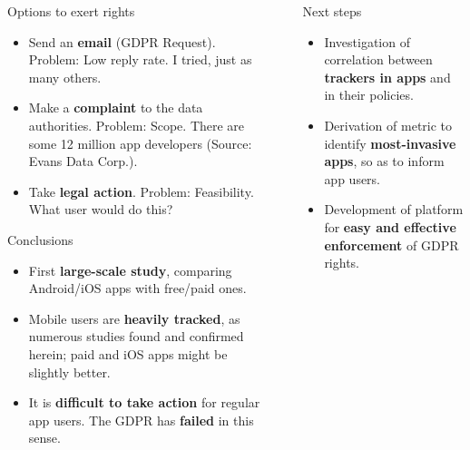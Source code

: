 \documentclass[final,noamsthm]{beamer}
\newlength{\sepwid}
\newlength{\onecolwid}
\begin{document}
\begin{frame}[t]
\begin{columns}[t]
	\begin{column}{\onecolwid} %
		\begin{block}{Options to exert rights}
			\begin{itemize}
				\item Send an \textbf{email} (GDPR 
				Request).				
				Problem: Low reply rate. I tried, just as many others.
				\item Make a \textbf{complaint} to the data authorities.
				Problem: Scope. There are some 12 million app 
				developers (Source: Evans Data Corp.).
				\item Take \textbf{legal action}. Problem: Feasibility. 
				What user would do this?
			\end{itemize}
		\end{block}
		\begin{block}{Conclusions}
			\begin{itemize}
				\item First \textbf{large-scale study}, comparing 
				Android/iOS apps with 
				free/paid ones.
				\item Mobile users are \textbf{heavily tracked}, as 
				numerous studies found and confirmed herein; paid and iOS 
				apps might be slightly better.
				\item It is \textbf{difficult to take action} for regular 
				app 
				users. The GDPR has \textbf{failed} in this sense. 
			\end{itemize} 
		\end{block}
		
	\end{column}
	\begin{column}{\sepwid}\end{column} %
	
	\begin{column}{\onecolwid} %
		\begin{block}{Next steps}
			\begin{itemize}
				\item Investigation of
				correlation between \textbf{trackers in 
				apps} and in their policies.
				\item Derivation of metric to identify 
				\textbf{most-invasive apps}, so as to inform app users.
				\item Development of platform for \textbf{easy and 
				effective enforcement} of GDPR rights.
			\end{itemize}
		\end{block}
	

\end{column}
\end{columns}
\end{frame}
\end{document}
